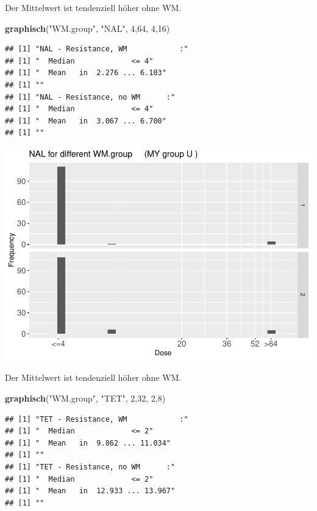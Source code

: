 \documentclass[
]{article}
\newenvironment{Shaded}{\begin{snugshade}}{\end{snugshade}}
\newcommand{\DecValTok}[1]{\textcolor[rgb]{0.00,0.00,0.81}{#1}}
\newcommand{\KeywordTok}[1]{\textcolor[rgb]{0.13,0.29,0.53}{\textbf{#1}}}
\newcommand{\NormalTok}[1]{#1}
\newcommand{\StringTok}[1]{\textcolor[rgb]{0.31,0.60,0.02}{#1}}
\begin{document}
Der Mittelwert ist tendenziell höher ohne WM.

\begin{Shaded}
\begin{Highlighting}[]
  \KeywordTok{graphisch}\NormalTok{(}\StringTok{"WM.group"}\NormalTok{, }\StringTok{"NAL"}\NormalTok{, }\DecValTok{4}\NormalTok{,}\DecValTok{64}\NormalTok{, }\DecValTok{4}\NormalTok{,}\DecValTok{16}\NormalTok{) }
\end{Highlighting}
\end{Shaded}

\begin{verbatim}
## [1] "NAL - Resistance, WM            :"
## [1] "  Median             <= 4"
## [1] "  Mean   in  2.276 ... 6.103"
## [1] ""
## [1] "NAL - Resistance, no WM      :"
## [1] "  Median             <= 4"
## [1] "  Mean   in  3.067 ... 6.700"
## [1] ""
\end{verbatim}

\includegraphics{Verteilungen_files/figure-latex/unnamed-chunk-40-1.pdf}

Der Mittelwert ist tendenziell höher ohne WM.

\begin{Shaded}
\begin{Highlighting}[]
  \KeywordTok{graphisch}\NormalTok{(}\StringTok{"WM.group"}\NormalTok{, }\StringTok{"TET"}\NormalTok{, }\DecValTok{2}\NormalTok{,}\DecValTok{32}\NormalTok{, }\DecValTok{2}\NormalTok{,}\DecValTok{8}\NormalTok{) }
\end{Highlighting}
\end{Shaded}

\begin{verbatim}
## [1] "TET - Resistance, WM            :"
## [1] "  Median             <= 2"
## [1] "  Mean   in  9.862 ... 11.034"
## [1] ""
## [1] "TET - Resistance, no WM      :"
## [1] "  Median             <= 2"
## [1] "  Mean   in  12.933 ... 13.967"
## [1] ""
\end{verbatim}
\end{document}
